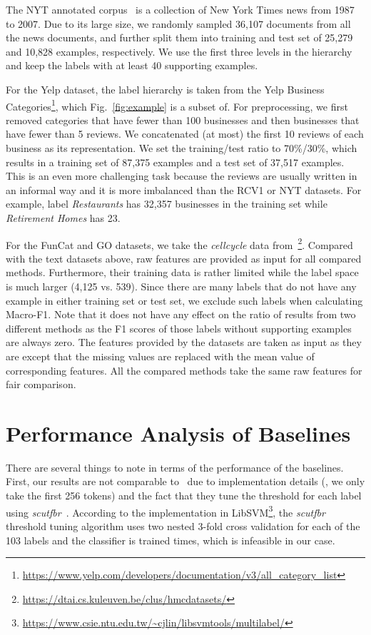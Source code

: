 \documentclass[11pt,a4paper]{article}
\begin{document}
The NYT annotated corpus~\citep{sandhaus2008new} is a collection of New York Times news from 1987 to 2007.
Due to its large size, we randomly sampled 36,107 documents from all the news documents, and further split them into training and test set of 25,279 and 10,828 examples, respectively. 
We use the first three levels in the hierarchy and keep the labels with at least 40 supporting examples.

For the Yelp dataset, the label hierarchy is taken from the Yelp Business Categories\footnote{\url{https://www.yelp.com/developers/documentation/v3/all\_category\_list}}, which Fig.~\ref{fig:example} is a subset of.
For preprocessing, we first removed categories that have fewer than 100 businesses and then businesses that have fewer than 5 reviews.
We concatenated (at most) the first 10 reviews of each business as its representation.
We set the training/test ratio to 70\%/30\%, which results in a training set of 87,375 examples and a test set of 37,517 examples.
This is an even more challenging task because the reviews are usually written in an informal way and it is more imbalanced than the RCV1 or NYT datasets.
For example, label \textit{Restaurants} has 32,357 businesses in the training set while \textit{Retirement Homes} has 23.


For the FunCat and GO datasets, we take the \textit{cellcycle} data from~\cite{vens2008decision}\footnote{\url{https://dtai.cs.kuleuven.be/clus/hmcdatasets/}}.
Compared with the text datasets above, raw features are provided as input for all compared methods.
Furthermore, their training data is rather limited while the label space is much larger (4,125 vs. 539).
Since there are many labels that do not have any example in either training set or test set, we exclude such labels when calculating Macro-F1. Note that it does not have any effect on the ratio of results from two different methods as the F1 scores of those labels without supporting examples are always zero.
The features provided by the datasets are taken as input as they are except that the missing values are replaced with the mean value of corresponding features.
All the compared methods take the same raw features for fair comparison.

\section{Performance Analysis of Baselines}
\label{app_baseline}
There are several things to note in terms of the performance of the baselines.
First, our results are not comparable to~\citet{lewis2004rcv1,johnson2014effective} due to implementation details (\eg, we only take the first 256 tokens) and the fact that they tune the threshold for each label using \textit{scutfbr}~\cite{lewis2004rcv1}.
According to the implementation in LibSVM\footnote{\url{https://www.csie.ntu.edu.tw/~cjlin/libsvmtools/multilabel/}}, the \textit{scutfbr} threshold tuning algorithm uses two nested 3-fold cross validation for each of the 103 labels and the classifier is trained  times, which is infeasible in our case.
\end{document}
